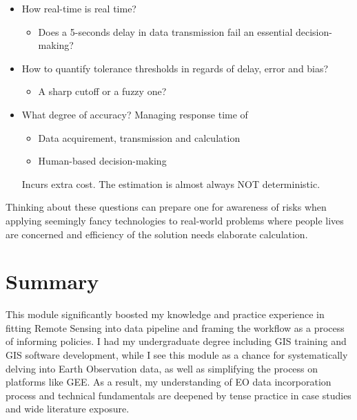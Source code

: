 \documentclass[
  letterpaper,
  DIV=11,
  numbers=noendperiod]{scrreprt}
\providecommand{\tightlist}{%
  \setlength{\itemsep}{0pt}\setlength{\parskip}{0pt}}\usepackage{longtable,booktabs,array}
\begin{document}
\begin{itemize}
\tightlist
\item
  How real-time is real time?

  \begin{itemize}
  \tightlist
  \item
    Does a 5-seconds delay in data transmission fail an essential
    decision-making?
  \end{itemize}
\item
  How to quantify tolerance thresholds in regards of delay, error and
  bias?

  \begin{itemize}
  \tightlist
  \item
    A sharp cutoff or a fuzzy one?
  \end{itemize}
\item
  What degree of accuracy? Managing response time of

  \begin{itemize}
  \tightlist
  \item
    Data acquirement, transmission and calculation
  \item
    Human-based decision-making
  \end{itemize}

  Incurs extra cost. The estimation is almost always NOT deterministic.
\end{itemize}

Thinking about these questions can prepare one for awareness of risks
when applying seemingly fancy technologies to real-world problems where
people lives are concerned and efficiency of the solution needs
elaborate calculation.


\hypertarget{summary-8}{%
\chapter{Summary}\label{summary-8}}

This module significantly boosted my knowledge and practice experience
in fitting Remote Sensing into data pipeline and framing the workflow as
a process of informing policies. I had my undergraduate degree including
GIS training and GIS software development, while I see this module as a
chance for systematically delving into Earth Observation data, as well
as simplifying the process on platforms like GEE. As a result, my
understanding of EO data incorporation process and technical
fundamentals are deepened by tense practice in case studies and wide
literature exposure.
\end{document}
